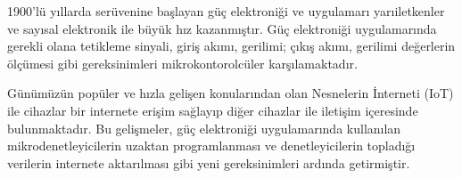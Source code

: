 1900’lü yıllarda serüvenine başlayan güç elektroniği ve uygulamarı
yarıiletkenler ve sayısal elektronik ile büyük hız kazanmıştır. Güç elektroniği
uygulamarında gerekli olana tetikleme sinyali, giriş akımı, gerilimi; çıkış
akımı, gerilimi değerlerin ölçümesi gibi gereksinimleri mikrokontorolcüler
karşılamaktadır.

Günümüzün popüler ve hızla gelişen konularından olan Nesnelerin İnterneti
(IoT) ile cihazlar bir internete erişim sağlayıp diğer cihazlar ile iletişim
içeresinde bulunmaktadır. Bu gelişmeler, güç elektroniği uygulamarında
kullanılan mikrodenetleyicilerin uzaktan programlanması ve denetleyicilerin
topladığı verilerin internete aktarılması gibi yeni gereksinimleri ardında
getirmiştir.
